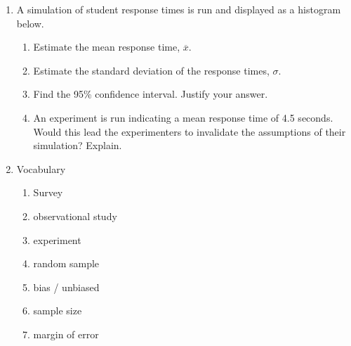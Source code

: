 \documentclass[12pt, twoside]{article}
\begin{document}
\begin{enumerate}
\item A simulation of student response times is run and displayed as a histogram below.
    \begin{center}
    \end{center}
    \begin{enumerate}[itemsep=2cm]
        \item Estimate the mean response time, $\overline{x}$.
        \item Estimate the standard deviation of the response times, $\sigma$.
        \item Find the 95\% confidence interval. Justify your answer.
        \item An experiment is run indicating a mean response time of 4.5 seconds. Would this lead the experimenters to invalidate the assumptions of their simulation? Explain.
    \end{enumerate}



\item Vocabulary \\ 
\begin{enumerate}
        \item Survey
        \item observational study
        \item experiment
        \item random sample
        \item bias / unbiased
        \item sample size
        \item margin of error
    \end{enumerate}


\end{enumerate}
\end{document}
